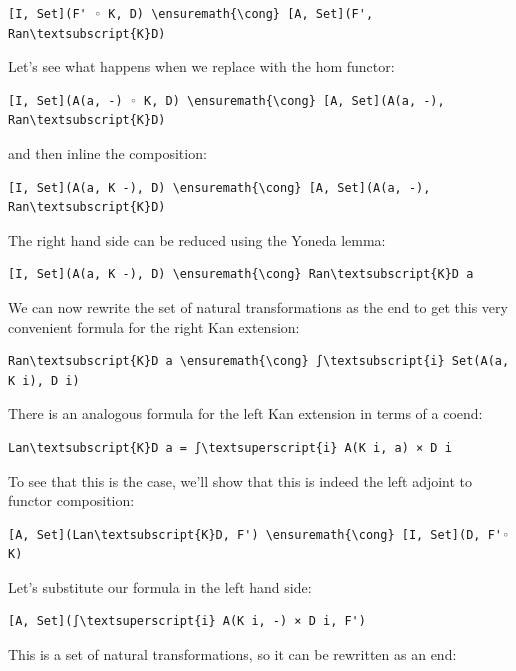 \begin{Verbatim}[commandchars=\\\{\}]
[I, Set](F' ◦ K, D) \ensuremath{\cong} [A, Set](F', Ran\textsubscript{K}D)
\end{Verbatim}
Let's see what happens when we replace  with the hom
functor:

\begin{Verbatim}[commandchars=\\\{\}]
[I, Set](A(a, -) ◦ K, D) \ensuremath{\cong} [A, Set](A(a, -), Ran\textsubscript{K}D)
\end{Verbatim}
and then inline the composition:

\begin{Verbatim}[commandchars=\\\{\}]
[I, Set](A(a, K -), D) \ensuremath{\cong} [A, Set](A(a, -), Ran\textsubscript{K}D)
\end{Verbatim}
The right hand side can be reduced using the Yoneda lemma:

\begin{Verbatim}[commandchars=\\\{\}]
[I, Set](A(a, K -), D) \ensuremath{\cong} Ran\textsubscript{K}D a
\end{Verbatim}
We can now rewrite the set of natural transformations as the end to get
this very convenient formula for the right Kan extension:

\begin{Verbatim}[commandchars=\\\{\}]
Ran\textsubscript{K}D a \ensuremath{\cong} ∫\textsubscript{i} Set(A(a, K i), D i)
\end{Verbatim}
There is an analogous formula for the left Kan extension in terms of a
coend:

\begin{Verbatim}[commandchars=\\\{\}]
Lan\textsubscript{K}D a = ∫\textsuperscript{i} A(K i, a) × D i
\end{Verbatim}
To see that this is the case, we'll show that this is indeed the left
adjoint to functor composition:

\begin{Verbatim}[commandchars=\\\{\}]
[A, Set](Lan\textsubscript{K}D, F') \ensuremath{\cong} [I, Set](D, F'◦ K)
\end{Verbatim}
Let's substitute our formula in the left hand side:

\begin{Verbatim}[commandchars=\\\{\}]
[A, Set](∫\textsuperscript{i} A(K i, -) × D i, F')
\end{Verbatim}
This is a set of natural transformations, so it can be rewritten as an
end:

